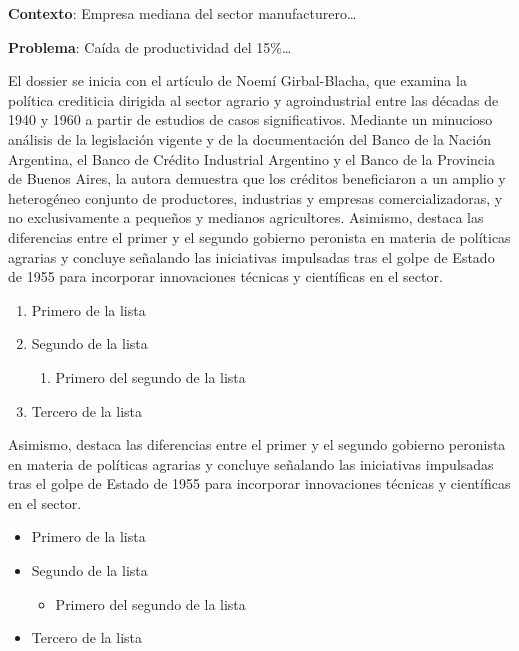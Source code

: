 \begin{tcolorbox}[colback=white,colframe=azulrevista,leftrule=3pt,rightrule=0pt,toprule=0pt,bottomrule=0pt,arc=0pt,left=8pt,right=4pt,top=3pt,bottom=3pt,before skip=4pt,after skip=4pt]
{\sffamily\small
\textbf{Contexto}: Empresa mediana del sector manufacturero…

\textbf{Problema}: Caída de productividad del 15\%…

}
\end{tcolorbox}

El dossier se inicia con el artículo de Noemí Girbal-Blacha, que examina la política crediticia dirigida al sector agrario y agroindustrial entre las décadas de 1940 y 1960 a partir de estudios de casos significativos. Mediante un minucioso análisis de la legislación vigente y de la documentación del Banco de la Nación Argentina, el Banco de Crédito Industrial Argentino y el Banco de la Provincia de Buenos Aires, la autora demuestra que los créditos beneficiaron a un amplio y heterogéneo conjunto de productores, industrias y empresas comercializadoras, y no exclusivamente a pequeños y medianos agricultores. Asimismo, destaca las diferencias entre el primer y el segundo gobierno peronista en materia de políticas agrarias y concluye señalando las iniciativas impulsadas tras el golpe de Estado de 1955 para incorporar innovaciones técnicas y científicas en el sector.

\begin{enumerate}
  \item Primero de la lista
  \item Segundo de la lista
\begin{enumerate}
  \item Primero del segundo de la lista
\end{enumerate}

  \item Tercero de la lista
\end{enumerate}

Asimismo, destaca las diferencias entre el primer y el segundo gobierno peronista en materia de políticas agrarias y concluye señalando las iniciativas impulsadas tras el golpe de Estado de 1955 para incorporar innovaciones técnicas y científicas en el sector.

\begin{itemize}
  \item Primero de la lista
  \item Segundo de la lista
\begin{itemize}
  \item Primero del segundo de la lista
\end{itemize}

  \item Tercero de la lista
\end{itemize}

